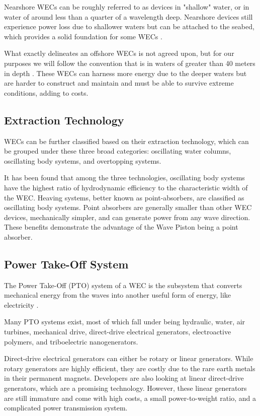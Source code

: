 \documentclass[journal]{IEEEtran}
\begin{document}
    Nearshore WECs can be roughly referred to as devices in "shallow" water, or in water of around less than a quarter of a wavelength deep. Nearshore devices still experience power loss due to shallower waters but can be attached to the seabed, which provides a solid foundation for some WECs \cite{doi:10.1243/09576509JPE782}.
    
    What exactly delineates an offshore WECs is not agreed upon, but for our purposes we will follow the convention that is in waters of greater than 40 meters in depth \cite{boyle2004renewable}. These WECs can harness more energy due to the deeper waters but are harder to construct and maintain and must be able to survive extreme conditions, adding to costs\cite{boyle2004renewable, doi:10.1243/09576509JPE782}.

\subsection{Extraction Technology}
    WECs can be further classified based on their extraction technology, which can be grouped under these three broad categories: oscillating water columns, oscillating body systems, and overtopping systems\cite{en12224329}.

    It has been found that among the three technologies, oscillating body systems have the highest ratio of hydrodynamic efficiency to the characteristic width of the WEC\cite{en12224329}. Heaving systems, better known as point-absorbers, are classified as oscillating body systems. Point absorbers are generally smaller than other WEC devices, mechanically simpler, and can generate power from any wave direction\cite{su14169936, HONG2014329}. These benefits demonstrate the advantage of the Wave Piston being a point absorber. 

\subsection{Power Take-Off System}
    The Power Take-Off (PTO) system of a WEC is the subsystem that converts mechanical energy from the waves into another useful form of energy, like electricity \cite{osti_1897711}.

    Many PTO systems exist, most of which fall under being hydraulic, water, air turbines, mechanical drive, direct-drive electrical generators, electroactive polymers, and triboelectric nanogenerators\cite{osti_1897711}.
    
    Direct-drive electrical generators can either be rotary or linear generators. While rotary generators are highly efficient, they are costly due to the rare earth metals in their permanent magnets\cite{osti_1897711}. Developers are also looking at linear direct-drive generators, which are a promising technology. However, these linear generators are still immature and come with high costs, a small power-to-weight ratio, and a complicated power transmission system\cite{su14169936, Leijon_2008, osti_1897711}.
\end{document}
